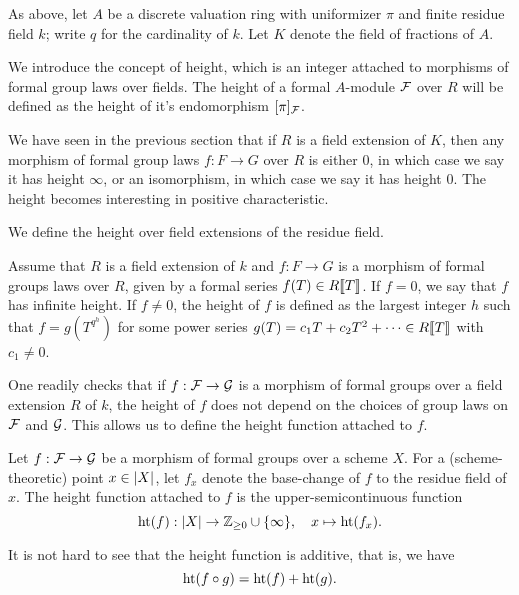 As above, let $A$ be a discrete valuation ring with uniformizer $\pi$ and finite 
residue field $k$; write $q$ for the cardinality of $k$. Let $K$ denote the
field of fractions of $A$.

We introduce the concept of height, which is an integer attached to
morphisms of formal group laws over fields. The height of a formal $A$-module
$\mathcal{F}$ over $R$ will be defined as the height of it's endomorphism $[\pi]_{\mathcal{F}}$. 

We have seen in the previous section that if $R$ is a field extension of $K$,
then any morphism of formal group laws $f: F \to G$ over $R$ is either $0$, in
which case we say it has height $\infty$, or an isomorphism, in which case we
say it has height $0$. The height becomes interesting in positive
characteristic. 

We define the height over field extensions of the residue field. 
\begin{defi}
  Assume that $R$ is a field extension of $k$ and $f: F \to G$ is a morphism of 
  formal groups laws over $R$, given by a formal series $f(T) \in R\llbracket T \rrbracket$. 
  If $f = 0$, we say that $f$ has infinite height. 
  If $f \neq 0$, the height of $f$ is defined as the largest integer $h$ such that 
  $f = g(T^{q^h})$ for some power series $g(T) = c_1 T + c_2 T^2 + \dots \in
  R\llbracket T \rrbracket$ with $c_1 \neq 0$. 
\end{defi}
One readily checks that if $f: \mathcal{F} \to \mathcal{G}$ is a morphism of formal groups over
a field extension $R$ of $k$, the height of $f$ does not depend on the choices
of group laws on $\mathcal{F}$ and $\mathcal{G}$. This allows us to define the height function 
attached to $f$. 
\begin{defi}
  Let $f: \mathcal{F} \to \mathcal{G}$ be a morphism of formal groups over a scheme $X$.
  For a (scheme-theoretic) point $x \in \lvert X \rvert$, let $f_x$ denote the 
  base-change of $f$ to the residue field of $x$. 
  The height function attached to $f$ is the upper-semicontinuous function
  \begin{equation} \label{eq:defheight}
    \textnormal{ht}(f) : \lvert X \rvert \to \mathbb{Z}_{\geq 0} \cup \{\infty\}, \quad x \mapsto 
    \textnormal{ht}(f_x).
  \end{equation}
\end{defi}
It is not hard to see that the height function is additive, that is, we have
\begin{equation*}
  \textnormal{ht}(f \circ g) = \textnormal{ht}(f) + \textnormal{ht}(g).
\end{equation*}

